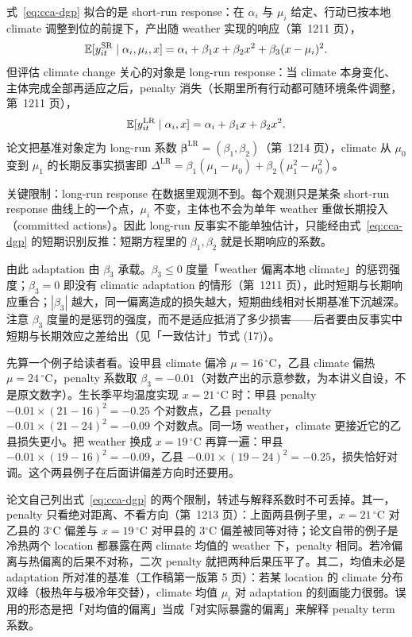 式~\ref{eq:cca-dgp} 拟合的是 short-run response：在 $\alpha_i$ 与 $\mu_i$ 给定、行动已按本地 climate 调整到位的前提下，产出随 weather 实现的响应（第~1211 页），
\begin{equation}
\mathbb{E}[y_{it}^{\mathrm{SR}} \mid \alpha_i, \mu_i, x] = \alpha_i + \beta_1 x + \beta_2 x^2 + \beta_3 (x-\mu_i)^2 .
\label{eq:cca-sr}
\end{equation}
但评估 climate change 关心的对象是 long-run response：当 climate 本身变化、主体完成全部再适应之后，penalty 消失（长期里所有行动都可随环境条件调整，第~1211 页），
\begin{equation}
\mathbb{E}[y_{it}^{\mathrm{LR}} \mid \alpha_i, x] = \alpha_i + \beta_1 x + \beta_2 x^2 .
\label{eq:cca-lr}
\end{equation}
论文把基准对象定为 long-run 系数 $\boldsymbol{\beta}^{\mathrm{LR}}=(\beta_1,\beta_2)$（第~1214 页），climate 从 $\mu_0$ 变到 $\mu_1$ 的长期反事实损害即 $\Delta^{\mathrm{LR}}=\beta_1(\mu_1-\mu_0)+\beta_2(\mu_1^2-\mu_0^2)$。

关键限制：long-run response 在数据里观测不到。每个观测只是某条 short-run response 曲线上的一个点，$\mu_i$ 不变，主体也不会为单年 weather 重做长期投入（committed actions）。因此 long-run 反事实不能单独估计，只能经由式~\ref{eq:cca-dgp} 的短期识别反推：短期方程里的 $\beta_1,\beta_2$ 就是长期响应的系数。

由此 adaptation 由 $\beta_3$ 承载。$\beta_3\le 0$ 度量「weather 偏离本地 climate」的惩罚强度；$\beta_3=0$ 即没有 climatic adaptation 的情形（第~1211 页），此时短期与长期响应重合；$|\beta_3|$ 越大，同一偏离造成的损失越大，短期曲线相对长期基准下沉越深。注意 $\beta_3$ 度量的是惩罚的强度，而不是适应抵消了多少损害——后者要由反事实中短期与长期效应之差给出（见「一致估计」节式 (17)）。

先算一个例子给读者看。设甲县 climate 偏冷 $\mu=16\,^\circ$C，乙县 climate 偏热 $\mu=24\,^\circ$C，penalty 系数取 $\beta_3=-0.01$（对数产出的示意参数，为本讲义自设，不是原文数字）。生长季平均温度实现 $x=21\,^\circ$C 时：甲县 penalty $-0.01\times(21-16)^2=-0.25$ 个对数点，乙县 penalty $-0.01\times(21-24)^2=-0.09$ 个对数点。同一场 weather，climate 更接近它的乙县损失更小。把 weather 换成 $x=19\,^\circ$C 再算一遍：甲县 $-0.01\times(19-16)^2=-0.09$，乙县 $-0.01\times(19-24)^2=-0.25$，损失恰好对调。这个两县例子在后面讲偏差方向时还要用。

\begin{pitfall}
\label{pit:cca-mu}
论文自己列出式~\ref{eq:cca-dgp} 的两个限制，转述与解释系数时不可丢掉。其一，penalty 只看绝对距离、不看方向（第~1213 页）：上面两县例子里，$x=21\,^\circ$C 对乙县的 3$^\circ$C 偏差与 $x=19\,^\circ$C 对甲县的 3$^\circ$C 偏差被同等对待；论文自带的例子是冷热两个 location 都暴露在两 climate 均值的 weather 下，penalty 相同。若冷偏离与热偏离的后果不对称，二次 penalty 就把两种后果压平了。其二，均值未必是 adaptation 所对准的基准（工作稿第一版第 5 页）：若某 location 的 climate 分布双峰（极热年与极冷年交替），climate 均值 $\mu_i$ 对 adaptation 的刻画能力很弱。误用的形态是把「对均值的偏离」当成「对实际暴露的偏离」来解释 penalty term 系数。
\end{pitfall}

